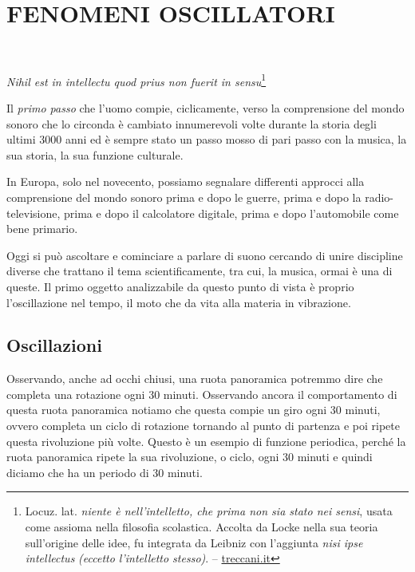 
\chapter{FENOMENI OSCILLATORI}

~\vfill

\begin{flushright}
		\textit{Nihil est in intellectu quod prius non fuerit in sensu}\footnote{
		Locuz. lat. \emph{niente è nell’intelletto, che prima non sia stato nei sensi},
		usata come assioma nella filosofia scolastica. Accolta da Locke nella
		sua teoria sull’origine delle idee, fu integrata da Leibniz con
		l’aggiunta \emph{nisi ipse intellectus} \emph{(eccetto l’intelletto stesso)}. --
		\url{treccani.it}}
	\end{flushright}

\bigskip

Il \emph{primo passo} che l'uomo compie, ciclicamente, verso la comprensione del
mondo sonoro che lo circonda è cambiato innumerevoli volte durante la storia degli
ultimi 3000 anni ed è sempre stato un passo mosso di pari passo con la musica,
la sua storia, la sua funzione culturale.

In Europa, solo nel novecento, possiamo segnalare differenti approcci alla
comprensione del mondo sonoro prima e dopo le guerre, prima e dopo la radio-televisione,
prima e dopo il calcolatore digitale, prima e dopo l'automobile come bene primario.


Oggi si può ascoltare e cominciare a parlare di suono cercando di unire discipline diverse
che trattano il tema scientificamente, tra cui, la musica, ormai è una di queste.
Il primo oggetto analizzabile da questo punto di vista è proprio l'oscillazione nel tempo,
il moto che da vita alla materia in vibrazione.

\clearpage

\section{Oscillazioni}

Osservando, anche ad occhi chiusi, una ruota panoramica potremmo dire che
completa una rotazione ogni 30 minuti. Osservando ancora il comportamento di
questa ruota panoramica notiamo che questa compie un giro ogni 30 minuti,
ovvero completa un ciclo di rotazione tornando al punto di partenza e poi
ripete questa rivoluzione più volte. Questo è un esempio di funzione periodica,
perché la ruota panoramica ripete la sua rivoluzione, o ciclo, ogni 30 minuti
e quindi diciamo che ha un periodo di 30 minuti.


